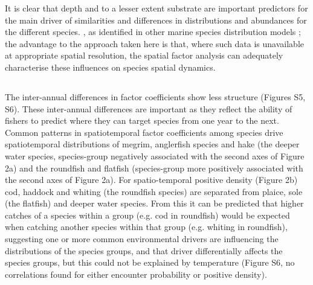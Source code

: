 \documentclass{nature}
\begin{document}
\begin{linenumbers}
It is clear that depth and to a lesser extent substrate are important
predictors for the main driver of similarities and differences in distributions
and abundances for the different species. , as
identified in other marine species distribution models \cite{Robinson2011}; the
advantage to the approach taken here is that, where such data is unavailable at
appropriate spatial resolution, the spatial factor analysis can adequately
characterise these influences on species spatial dynamics.

\subsection{}  The inter-annual differences in factor
coefficients show less structure (Figures S5, S6). These inter-annual
differences are important as they reflect the ability of fishers to predict
where they can target species from one year to the next.  Common patterns in spatiotemporal factor coefficients
among species   drive spatiotemporal distributions of megrim,
anglerfish species and hake (the deeper water species, species-group
negatively associated with the second axes of Figure 2a) and the roundfish and
flatfish (species-group more positively associated with the second axes of
Figure 2a). For spatio-temporal positive density (Figure 2b) cod, haddock and
whiting (the roundfish species) are separated from plaice, sole (the flatfish)
and deeper water species.  From this it can be predicted that
higher catches of a species within a group (e.g.  cod in roundfish) would be
expected when catching another species within that group (e.g. whiting in
roundfish),  suggesting  one or more common
environmental drivers are influencing the distributions of the species groups,
and that driver differentially affects the species groups, but this could not
be explained by temperature  (Figure S6, no correlations found
for either encounter probability or positive density).


\end{linenumbers}
\end{document}
